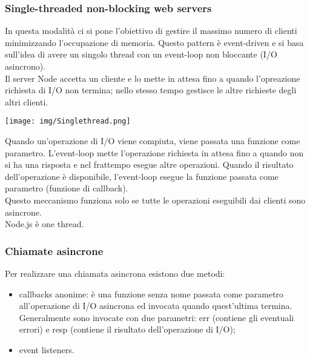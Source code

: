 \documentclass{article}
\begin{document}
\subsubsection{Single-threaded non-blocking web servers}
In questa modalità ci si pone l'obiettivo di gestire il massimo numero di clienti minimizzando l'occupazione di memoria. Questo pattern è event-driven e si basa sull'idea di avere un singolo thread con un event-loop non bloccante (I/O asincrono).\\
Il server Node accetta un cliente e lo mette in attesa fino a quando l'opreazione richiesta di I/O non termina; nello stesso tempo gestisce le altre richieste degli altri clienti. \\
\begin{center}
\texttt{[image: img/Singlethread.png]}
\end{center}
Quando un'operazione di I/O viene compiuta, viene passata una funzione come parametro. L'event-loop mette l'operazione richiesta in attesa fino a quando non si ha una risposta e nel frattempo esegue altre operazioni. Quando il risultato dell'operazione è disponibile, l'event-loop esegue la funzione passata come parametro (funzione di callback). \\
Questo meccanismo funziona solo se tutte le operazioni eseguibili dai clienti sono asincrone.\\
Node.js è one thread.
\subsubsection{Chiamate asincrone}
Per realizzare una chiamata asincrona esistono due metodi:
\begin{itemize}
    \item callbacks anonime: è una funzione senza nome passata come parametro all'operazione di I/O asincrona ed invocata quando quest'ultima termina. Generalmente sono invocate con due parametri: err (contiene gli eventuali errori) e resp (contiene il risultato dell'operazione di I/O);
    \item event listeners.
\end{itemize}
\end{document}
